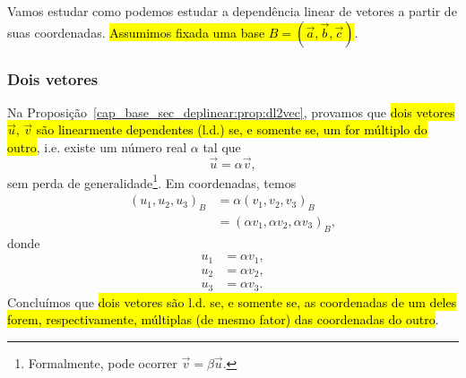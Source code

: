 Vamos estudar como podemos estudar a dependência linear de vetores a partir de suas coordenadas. \hl{Assumimos fixada uma base $B = \left(\vec{a}, \vec{b}, \vec{c}\right)$}.

\subsubsection{Dois vetores}

Na Proposição~\ref{cap_base_sec_deplinear:prop:dl2vec}, provamos que \hl{dois vetores $\vec{u}$, $\vec{v}$ são linearmente dependentes (l.d.) se, e somente se, um for múltiplo do outro}, i.e. existe um número real $\alpha$ tal que
\begin{equation}\label{cap_base_sec_base:eq:cbsb_vmv}
  \vec{u} = \alpha\vec{v},
\end{equation}
sem perda de generalidade\footnote{Formalmente, pode ocorrer $\vec{v} = \beta\vec{u}$.}. Em coordenadas, temos
\begin{align}
  (u_1, u_2, u_3)_B &= \alpha(v_1, v_2, v_3)_B\\
                    &= (\alpha v_1, \alpha v_2, \alpha v_3)_B,
\end{align}
donde
\begin{align}
  u_1 &= \alpha v_1,\\
  u_2 &= \alpha v_2,\\
  u_3 &= \alpha v_3.
\end{align}
Concluímos que \hl{dois vetores são l.d. se, e somente se, as coordenadas de um deles forem, respectivamente, múltiplas (de mesmo fator) das coordenadas do outro}.


